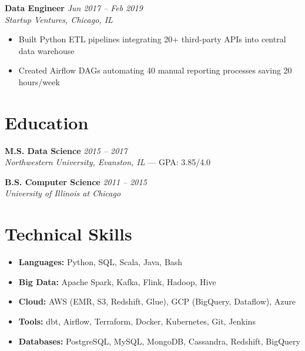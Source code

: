 \documentclass[11pt,letterpaper]{article}
\begin{document}
\textbf{Data Engineer} \hfill \textit{Jun 2017 -- Feb 2019} \\
\textit{Startup Ventures, Chicago, IL}
\begin{itemize}
  \item Built Python ETL pipelines integrating 20+ third-party APIs into central data warehouse
  \item Created Airflow DAGs automating 40 manual reporting processes saving 20 hours/week
\end{itemize}

\section{Education}

\textbf{M.S. Data Science} \hfill \textit{2015 -- 2017} \\
\textit{Northwestern University, Evanston, IL} --- GPA: 3.85/4.0

\textbf{B.S. Computer Science} \hfill \textit{2011 -- 2015} \\
\textit{University of Illinois at Chicago}

\section{Technical Skills}

\begin{itemize}
  \item \textbf{Languages:} Python, SQL, Scala, Java, Bash
  \item \textbf{Big Data:} Apache Spark, Kafka, Flink, Hadoop, Hive
  \item \textbf{Cloud:} AWS (EMR, S3, Redshift, Glue), GCP (BigQuery, Dataflow), Azure
  \item \textbf{Tools:} dbt, Airflow, Terraform, Docker, Kubernetes, Git, Jenkins
  \item \textbf{Databases:} PostgreSQL, MySQL, MongoDB, Cassandra, Redshift, BigQuery
\end{itemize}
\end{document}
